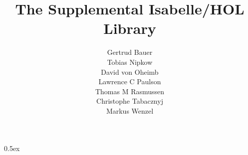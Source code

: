 \documentclass[11pt,a4paper]{article}
\begin{document}
\title{The Supplemental Isabelle/HOL Library}
\author{
  Gertrud Bauer \\
  Tobias Nipkow \\
  David von Oheimb \\
  Lawrence C Paulson \\
  Thomas M Rasmussen \\
  Christophe Tabacznyj \\
  Markus Wenzel}
\maketitle

\tableofcontents
\newpage

\newcommand{\isabelletitle}{}\newcommand{\title}[1]{\gdef\isabelletitle{#1}}
\newcommand{\isabelleauthor}{}\newcommand{\author}[1]{\gdef\isabelleauthor{#1}}
\renewcommand{\isamarkupheader}[1]%
{\title{***~Theory ``\isabellecontext'': unknown title}\author{}%
#1%
\ifthenelse{\equal{}{\isabelletitle}}{}{\newpage\section{\isabelletitle}}%
\markright{THEORY~``\isabellecontext''}%
\ifthenelse{\equal{}{\isabelleauthor}}{}%
{{\flushright\footnotesize\sl (By \isabelleauthor)\par\bigskip}}}

\parindent 0pt \parskip 0.5ex


\pagestyle{headings}


\end{document}
